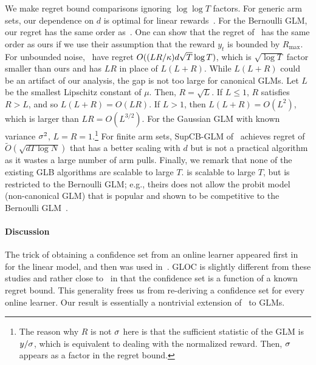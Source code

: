 We make regret bound comparisons ignoring $\log\log T$ factors.
For generic arm sets, our dependence on $d$ is optimal for linear rewards~\cite{rusmevichientong10linearly}.
For the Bernoulli GLM, our regret has the same order as~\citet{zhang16online}.
One can show that the regret of~\citet{filippi10parametric} has the same order as ours if we use their assumption that the reward $y_t$ is bounded by $R_{\max}$. %
For unbounded noise,~\citet{li17provable} have regret $O((LR/{\kappa}) d\sqrt{T} \log T)$, which is $\sqrt{\log T}$ factor smaller than ours and has $LR$ in place of $L(L+R)$.
While $L(L+R)$ could be an artifact of our analysis, the gap is not too large for canonical GLMs.
Let $L$ be the smallest Lipschitz constant of $\mu$.
Then, $R=\sqrt{L}$.
If $L \le 1$, $R$ satisfies $R > L$, and so $L(L+R)=O(LR)$.
If $L > 1$, then $L(L+R) = O(L^2)$, which is larger than $LR = O(L^{3/2})$.
For the Gaussian GLM with known variance $\sigma^2$, $L=R=1$.\footnote{
  The reason why $R$ is not $\sigma$ here is that the sufficient statistic of the GLM is $y/\sigma$, which is equivalent to dealing with the normalized reward.
  Then, $\sigma$ appears as a factor in the regret bound.
}
For finite arm sets, SupCB-GLM of~\citet{li17provable} achieves regret of $\tilde O(\sqrt{dT\log N})$ that has a better scaling with $d$ but is not a practical algorithm as it wastes a large number of arm pulls.
Finally, we remark that none of the existing GLB algorithms are scalable to large $T$.
\citet{zhang16online} is scalable to large $T$, but is restricted to the Bernoulli GLM; e.g., theirs does not allow the probit model (non-canonical GLM) that is popular and shown to be competitive to the Bernoulli GLM~\cite{li12anunbiased}.



\vspace{-4pt}
\paragraph{Discussion} 
The trick of obtaining a confidence set from an online learner appeared first in~\cite{dekel10robust,dekel12selective} for the linear model, and then was used in~\cite{crammer13multiclass,gentile14onmultilabel,zhang16online}.
GLOC is slightly different from these studies and rather close to~\citet{ay12online} in that the confidence set is a function of a known regret bound. %
This generality frees us from re-deriving a confidence set for every online learner. %
Our result is essentially a nontrivial extension of~\citet{ay12online} to GLMs.

